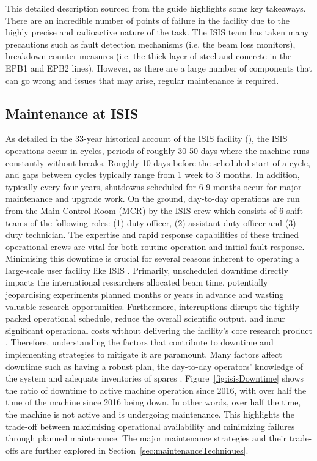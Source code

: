 \documentclass[10pt,oneside]{report}
\begin{document}
\noindent This detailed description sourced from the guide highlights some key takeaways. There are an incredible number of points of failure in the facility due to the highly precise and radioactive nature of the task. The ISIS team has taken many precautions such as fault detection mechanisms (i.e. the beam loss monitors), breakdown counter-measures (i.e. the thick layer of steel and concrete in the EPB1 and EPB2 lines). However, as there are a large number of components that can go wrong and issues that may arise, regular maintenance is required. 

\subsection{Maintenance at ISIS} 
As detailed in the 33-year historical account of the ISIS facility (\citet{thomason2019isis}), the ISIS operations occur in cycles, periods of roughly 30-50 days where the machine runs constantly without breaks. Roughly 10 days before the scheduled start of a cycle, and gaps between cycles typically range from 1 week to 3 months. In addition, typically every four years, shutdowns scheduled for 6-9 months occur for major maintenance and upgrade work. On the ground, day-to-day operations are run from the Main Control Room (MCR) by the ISIS crew which consists of 6 shift teams of the following roles: (1) duty officer, (2) assistant duty officer and (3) duty technician.  The expertise and rapid response capabilities of these trained operational crews are vital for both routine operation and initial fault response.
Minimising this downtime is crucial for several reasons inherent to operating a large-scale user facility like ISIS \cite{thomason2019isis}. Primarily, unscheduled downtime directly impacts the international researchers allocated beam time, potentially jeopardising experiments planned months or years in advance and wasting valuable research opportunities. Furthermore, interruptions disrupt the tightly packed operational schedule, reduce the overall scientific output, and incur significant operational costs without delivering the facility's core research product \cite{thomason2019isis}. Therefore, understanding the factors that contribute to downtime and implementing strategies to mitigate it are paramount.
Many factors affect downtime such as having a robust plan, the day-to-day operators' knowledge of the system and adequate inventories of spares \cite{thomason2019isis}. Figure~\ref{fig:isisDowntime} shows the ratio of downtime to active machine operation since 2016, with over half the time of the machine since 2016 being down. In other words, over half the time, the machine is not active and is undergoing maintenance. This highlights the trade-off between maximising operational availability and minimizing failures through planned maintenance. The major maintenance strategies and their trade-offs are further explored in Section~\ref{sec:maintenanceTechniques}.
\end{document}
